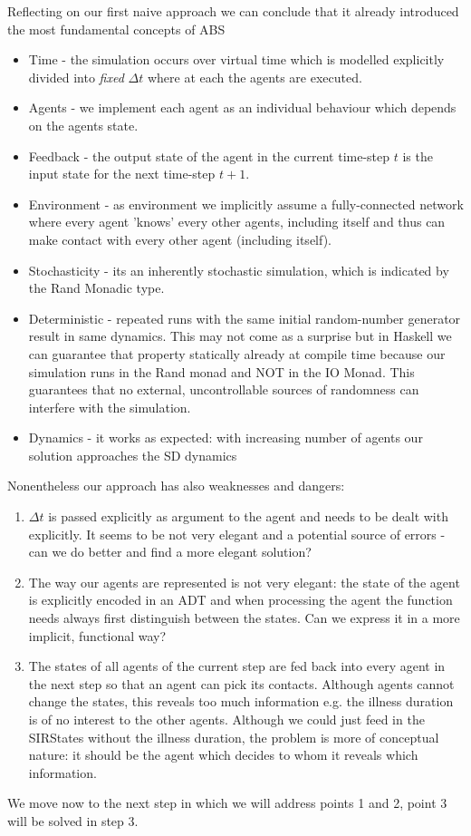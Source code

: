Reflecting on our first naive approach we can conclude that it already introduced the most fundamental concepts of ABS
\begin{itemize}
	\item Time - the simulation occurs over virtual time which is modelled explicitly divided into \textit{fixed} $\Delta t$ where at each the agents are executed.
	\item Agents - we implement each agent as an individual behaviour which depends on the agents state.
	\item Feedback - the output state of the agent in the current time-step $t$ is the input state for the next time-step $t+1$.
	\item Environment - as environment we implicitly assume a fully-connected network where every agent 'knows' every other agents, including itself and thus can make contact with every other agent (including itself).
	\item Stochasticity - its an inherently stochastic simulation, which is indicated by the Rand Monadic type.
	\item Deterministic - repeated runs with the same initial random-number generator result in same dynamics. This may not come as a surprise but in Haskell we can guarantee that property statically already at compile time because our simulation runs in the Rand monad and NOT in the IO Monad. This guarantees that no external, uncontrollable sources of randomness can interfere with the simulation.
	\item Dynamics - it works as expected: with increasing number of agents our solution approaches the SD dynamics 
\end{itemize}

Nonentheless our approach has also weaknesses and dangers:
\begin{enumerate}
	\item $\Delta t$ is passed explicitly as argument to the agent and needs to be dealt with explicitly. It seems to be not very elegant and a potential source of errors - can we do better and find a more elegant solution? 
	\item The way our agents are represented is not very elegant: the state of the agent is explicitly encoded in an ADT and when processing the agent the function needs always first distinguish between the states. Can we express it in a more implicit, functional way?
	\item The states of all agents of the current step are fed back into every agent in the next step so that an agent can pick its contacts. Although agents cannot change the states, this reveals too much information e.g. the illness duration is of no interest to the other agents. Although we could just feed in the SIRStates without the illness duration, the problem is more of conceptual nature: it should be the agent which decides to whom it reveals which information.
\end{enumerate}

We move now to the next step in which we will address points 1 and 2, point 3 will be solved in step 3.